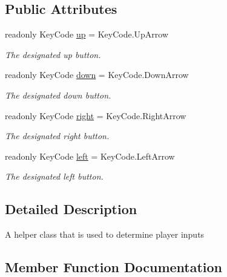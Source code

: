\subsection*{Public Attributes}
\begin{DoxyCompactItemize}
\item 
readonly Key\+Code \mbox{\hyperlink{class_input_handler_aad98122542322e661a5ce08de06ddcff}{up}} = Key\+Code.\+Up\+Arrow
\begin{DoxyCompactList}\small\item\em The designated up button. \end{DoxyCompactList}\item 
readonly Key\+Code \mbox{\hyperlink{class_input_handler_a20c863bc703b4fa72d04418ce8e9f7b1}{down}} = Key\+Code.\+Down\+Arrow
\begin{DoxyCompactList}\small\item\em The designated down button. \end{DoxyCompactList}\item 
readonly Key\+Code \mbox{\hyperlink{class_input_handler_a4cfd6097eeeb93e5b51e94c76459f80f}{right}} = Key\+Code.\+Right\+Arrow
\begin{DoxyCompactList}\small\item\em The designated right button. \end{DoxyCompactList}\item 
readonly Key\+Code \mbox{\hyperlink{class_input_handler_a56211f2a1a7fa97f538e0fcf25f20208}{left}} = Key\+Code.\+Left\+Arrow
\begin{DoxyCompactList}\small\item\em The designated left button. \end{DoxyCompactList}\end{DoxyCompactItemize}


\subsection{Detailed Description}
A helper class that is used to determine player inputs 



\subsection{Member Function Documentation}
\mbox{\label{class_input_handler_af2d1a0f6af55ed606aca98bbe8416a50}} 

